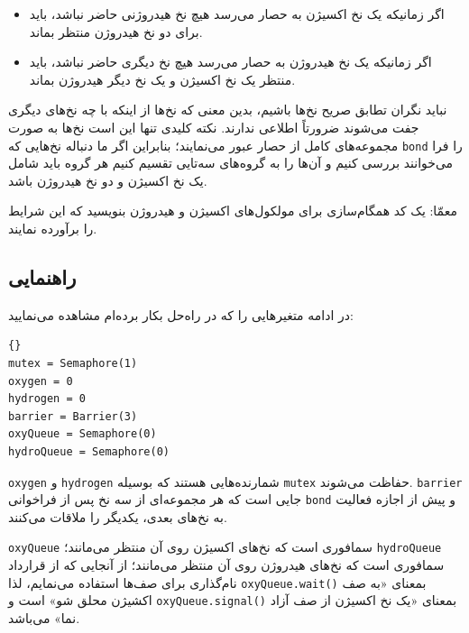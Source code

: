 \documentclass{book}
\newcommand{\clearemptydoublepage}{\newpage\cleardoublepage}
\begin{document}
\begin{itemize}

\item
    اگر زمانیکه یک نخ اکسیژن به حصار می‌رسد هیچ نخ‌ هیدروژنی حاضر نباشد، باید برای دو نخ هیدروژن منتظر بماند. 

\item 
    اگر زمانیکه یک نخ هیدروژن به حصار می‌رسد هیچ نخ دیگری حاضر نباشد، باید منتظر یک نخ  اکسیژن و یک نخ دیگر هیدروژن بماند. 
\end{itemize}

    نباید نگران تطابق صریح نخ‌ها باشیم،‌ بدین معنی که نخ‌ها  از اینکه با چه نخ‌های دیگری جفت می‌شوند ضرورتاً  اطلاعی ندارند. نکته کلیدی تنها این است 
    نخ‌ها به صورت مجموعه‌های کامل از حصار عبور می‌نمایند؛ بنابراین اگر ما دنباله نخ‌هایی که {\tt bond} را فرا می‌خوانند بررسی کنیم و آن‌ها را به گروه‌های 
    سه‌تایی تقسیم کنیم هر گروه باید شامل یک نخ اکسیژن و دو نخ هیدروژن باشد. 

    معمّا:‌ یک کد همگام‌سازی برای مولکول‌های اکسیژن و هیدروژن بنویسید که این شرایط را برآورده نمایند. 


\clearemptydoublepage
\subsection {راهنمایی }

    در ادامه متغیرهایی را که در راه‌حل بکار برده‌ام مشاهده می‌نمایید:

\begin{latin}
\begin{lstlisting}[title=\rl{راهنمایی ساخت آب}]{}
mutex = Semaphore(1)
oxygen = 0
hydrogen = 0
barrier = Barrier(3)
oxyQueue = Semaphore(0)
hydroQueue = Semaphore(0)
\end{lstlisting}
\end{latin}

    {\tt oxygen} و {\tt hydrogen} شمارنده‌هایی هستند که بوسیله {\tt mutex} حفاظت می‌شوند. {\tt barrier} 
    جایی است که هر مجموعه‌ای از سه نخ پس از فراخوانی {\tt bond} و پیش از اجازه فعالیت به نخ‌های بعدی، یکدیگر را ملاقات می‌کنند. 
    

    {\tt oxyQueue} سمافوری است که نخ‌های اکسیژن روی آن منتظر می‌مانند؛ 
    {\tt hydroQueue} سمافوری است که نخ‌های هیدروژن روی آن منتظر می‌مانند؛ 
    از آنجایی که از قرارداد نام‌گذاری برای صف‌ها استفاده می‌نمایم، لذا {\tt oxyQueue.wait()} بمعنای «به صف اکشیژن محلق شو» است 
    و {\tt oxyQueue.signal()} بمعنای «یک نخ اکسیژن از صف آزاد نما» می‌باشد. 


\clearemptydoublepage
\end{document}
